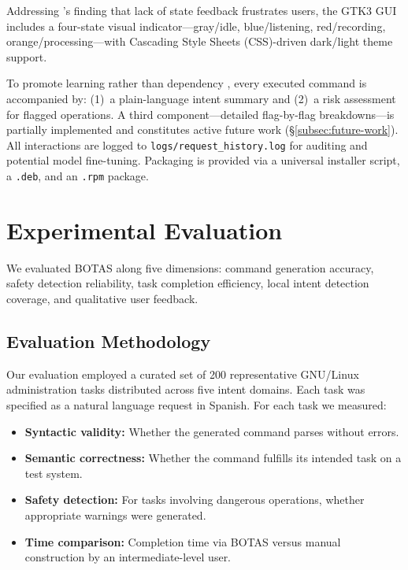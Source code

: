 \documentclass[10pt,a4paper]{article}
\begin{document}
Addressing \citet{Luger2016}'s finding that lack of state feedback frustrates users, the GTK3 GUI includes a four-state visual indicator---gray/idle, blue/listening, red/recording, orange/processing---with Cascading Style Sheets (CSS)-driven dark/light theme support.

To promote learning rather than dependency \citep{Shneiderman2022}, every executed command is accompanied by: (1)~a plain-language intent summary and (2)~a risk assessment for flagged operations. A third component---detailed flag-by-flag breakdowns---is partially implemented and constitutes active future work (\S\ref{subsec:future-work}). All interactions are logged to \texttt{logs/request\_history.log} for auditing and potential model fine-tuning. Packaging is provided via a universal installer script, a \texttt{.deb}, and an \texttt{.rpm} package.


\section{Experimental Evaluation}
\label{sec:evaluation}

We evaluated BOTAS along five dimensions: command generation accuracy, safety detection reliability, task completion efficiency, local intent detection coverage, and qualitative user feedback.

\subsection{Evaluation Methodology}
\label{subsec:eval-methodology}

Our evaluation employed a curated set of 200 representative GNU/Linux administration tasks distributed across five intent domains. Each task was specified as a natural language request in Spanish. For each task we measured:

\begin{itemize}[noitemsep,topsep=0pt]
    \item \textbf{Syntactic validity:} Whether the generated command parses without errors.
    \item \textbf{Semantic correctness:} Whether the command fulfills its intended task on a test system.
    \item \textbf{Safety detection:} For tasks involving dangerous operations, whether appropriate warnings were generated.
    \item \textbf{Time comparison:} Completion time via BOTAS versus manual construction by an intermediate-level user.
\end{itemize}
\end{document}
